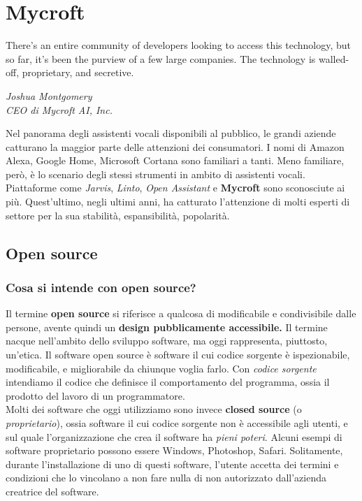 \chapter{Mycroft}
\label{chap:mycroft}
\epigraph{There’s an entire community of developers looking to access this technology, but so far, it’s been the purview of a few large companies. The technology is walled-off, proprietary, and secretive.}{\textit{Joshua Montgomery \\ CEO di Mycroft AI, Inc.}}
Nel panorama degli assistenti vocali disponibili al pubblico, le grandi aziende catturano la maggior parte delle attenzioni dei consumatori. I nomi di Amazon Alexa, Google Home, Microsoft Cortana sono familiari a tanti. Meno familiare, però, è lo scenario degli stessi strumenti in ambito di assistenti vocali. Piattaforme come \textit{Jarvis}, \textit{Linto}, \textit{Open Assistant} e \textbf{Mycroft} sono sconosciute ai più. Quest'ultimo, negli ultimi anni, ha catturato l'attenzione di molti esperti di settore per la sua stabilità, espansibilità, popolarità.
\section{Open source}
\subsection{Cosa si intende con open source?}
Il termine \textbf{open source} si riferisce a qualcosa di modificabile e condivisibile dalle persone, avente quindi un \textbf{design pubblicamente accessibile.} Il termine nacque nell'ambito dello sviluppo software, ma oggi rappresenta, piuttosto, un'etica. Il software open source è software il cui codice sorgente è ispezionabile, modificabile, e migliorabile da chiunque voglia farlo. Con \textit{codice sorgente} intendiamo il codice che definisce il comportamento del programma, ossia il prodotto del lavoro di un programmatore. \\
Molti dei software che oggi utilizziamo sono invece \textbf{closed source} (o \textit{proprietario}), ossia software il cui codice sorgente non è accessibile agli utenti, e sul quale l'organizzazione che crea il software ha \textit{pieni poteri}. Alcuni esempi di software proprietario possono essere Windows, Photoshop, Safari. Solitamente, durante l'installazione di uno di questi software, l'utente accetta dei termini e condizioni che lo vincolano a non fare nulla di non autorizzato dall'azienda creatrice del software.
